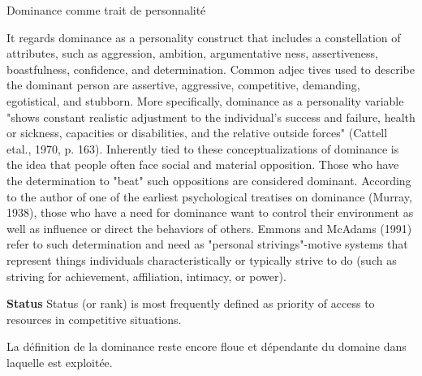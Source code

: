Dominance comme trait de personnalité


It regards dominance as a personality construct that
includes a constellation of attributes, such as aggression, ambition, argumentative
ness,
assertiveness, boastfulness, confidence, and determination. Common adjec
tives
used to describe the dominant person are assertive, aggressive, competitive,
demanding, egotistical, and stubborn. More specifically, dominance as a personality
variable "shows constant realistic adjustment to the individual's success and failure,
health or sickness, capacities or disabilities, and the relative outside forces" (Cattell
etal., 1970, p. 163). 
Inherently tied to these conceptualizations of dominance is the idea that people
often face social and material opposition. Those who have the determination to
"beat" such oppositions are considered dominant. According to the author of one of
the earliest psychological treatises on dominance (Murray, 1938), those who have a
need for dominance want to control their environment as well as influence or direct
the behaviors of others. Emmons and McAdams (1991) refer to such determination
and need as "personal strivings"-motive systems that represent things individuals
characteristically or typically strive to do (such as striving for achievement, affiliation,
intimacy, or power).


\textbf{Status}
Status (or rank) is most frequently defined as priority of access to resources in
competitive situations.


La définition de la dominance reste encore floue et dépendante du domaine dans laquelle est exploitée. 